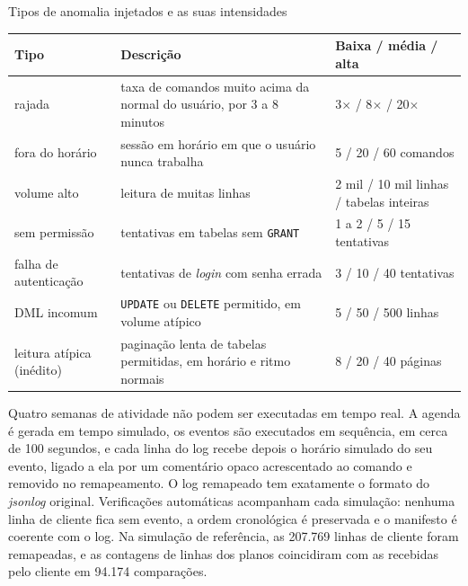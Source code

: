 \begin{quadro}[htb]
    \centering
    \ABNTEXfontereduzida
    \begin{minipage}{\textwidth}
        \caption{\label{qdr:anomalias}Tipos de anomalia injetados e as suas intensidades}
        \begin{tabular}{|L{3.0cm}|L{6.8cm}|L{4.8cm}|}
            \hline
            \textbf{Tipo} & \textbf{Descrição} & \textbf{Baixa / média / alta} \\
            \hline
            rajada & taxa de comandos muito acima da normal do usuário, por 3 a 8 minutos &
            3$\times$ / 8$\times$ / 20$\times$ \\
            \hline
            fora do horário & sessão em horário em que o usuário nunca trabalha &
            5 / 20 / 60 comandos \\
            \hline
            volume alto & leitura de muitas linhas & 2 mil / 10 mil linhas / tabelas inteiras \\
            \hline
            sem permissão & tentativas em tabelas sem \texttt{GRANT} & 1 a 2 / 5 / 15 tentativas \\
            \hline
            falha de autenticação & tentativas de \textit{login} com senha errada &
            3 / 10 / 40 tentativas \\
            \hline
            DML incomum & \texttt{UPDATE} ou \texttt{DELETE} permitido, em volume atípico &
            5 / 50 / 500 linhas \\
            \hline
            leitura atípica (inédito) & paginação lenta de tabelas permitidas, em horário e
            ritmo normais & 8 / 20 / 40 páginas \\
            \hline
        \end{tabular}
    \end{minipage}
\end{quadro}

Quatro semanas de atividade não podem ser executadas em tempo real. A agenda é gerada em tempo
simulado, os eventos são executados em sequência, em cerca de 100 segundos, e cada linha do log
recebe depois o horário simulado do seu evento, ligado a ela por um comentário opaco acrescentado
ao comando e removido no remapeamento. O log remapeado tem exatamente o formato do
\textit{jsonlog} original. Verificações automáticas acompanham cada simulação: nenhuma linha de
cliente fica sem evento, a ordem cronológica é preservada e o manifesto é coerente com o log. Na
simulação de referência, as 207.769 linhas de cliente foram remapeadas, e as contagens de linhas
dos planos coincidiram com as recebidas pelo cliente em 94.174 comparações.

